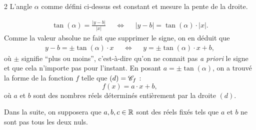 \begin{multicols}{2}
L'angle $\alpha$ comme défini ci-dessus est constant et mesure la pente de la droite.

	\begin{align*}
		\tan(\alpha) = \frac{|y-b|}{|x|} && \iff && |y-b| = \tan(\alpha) \cdot |x|.
	\end{align*}
Comme la valeur absolue ne fait que supprimer le signe, on en déduit que
	\begin{align*}
		y - b = \pm \tan(\alpha) \cdot x && \iff && y = \pm \tan(\alpha) \cdot x + b,
	\end{align*}
où $\pm$ signifie ``plus ou moins'', c'est-à-dire qu'on ne connait pas \emph{a priori} le signe et que cela n'importe pas pour l'instant.
En posant $a = \pm \tan(\alpha)$, on a trouvé la forme de la fonction $f$ telle que $(d) = \mathcal{C}_f$ :
	\[ f(x) = a\cdot x + b, \]
où $a$ et $b$ sont des nombres réels déterminés entièrement par la droite $(d)$.


\end{multicols}

\newpage

Dans la suite, on supposera que $a, b, c\in\mathbb{R}$ sont des réels fixés tels que $a$ et $b$ ne sont pas tous les deux nuls.







